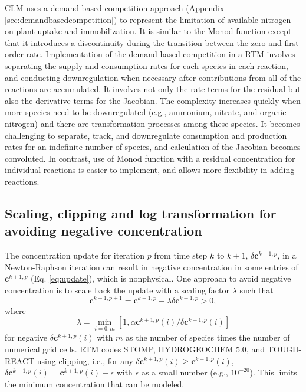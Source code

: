 \documentclass[gmd, manuscript]{copernicus}
\begin{document}
CLM uses a demand based competition approach (Appendix
\ref{sec:demandbasedcompetition}) to represent the limitation of available
nitrogen on plant uptake and immobilization. It is similar to the Monod
function except that it introduces a discontinuity during the transition
between the zero and first order rate. Implementation of the demand based
competition in a RTM involves separating the supply and consumption rates for
each species in each reaction, and conducting downregulation when necessary
after contributions from all of the reactions are accumulated. It involves not
only the rate terms for the residual but also the derivative terms for the
Jacobian. The complexity increases quickly when more species need to be
downregulated (e.g., ammonium, nitrate, and organic nitrogen) and there are
transformation processes among these species. It becomes challenging to
separate, track, and downregulate consumption and production rates for an
indefinite number of species, and calculation of the Jacobian becomes
convoluted. In contrast, use of Monod function with a residual concentration
for individual reactions is easier to implement, and allows more flexibility in
adding reactions.

\subsection{Scaling, clipping and log transformation for avoiding negative concentration}
The concentration update for iteration $p$ from time step $k$ to $k+1$, $\delta
\mathbf{c}^{k+1,p}$, in a Newton-Raphson iteration can result in negative
concentration in some entries of $\mathbf{c}^{k+1,p}$ (Eq. \ref{eq:update}),
which is nonphysical. One approach to avoid negative concentration is to scale
back the update with a scaling factor $\lambda$ \citep{Bethke2007,Hammond2003}
such that 
\begin{equation}
\mathbf{c}^{k+1,p+1}=\mathbf{c}^{k+1,p}+\lambda \delta \mathbf{c}^{k+1,p} > 0,
\label{eq:lambda}
\end{equation}
where
\begin{equation}
\lambda = \min_{i=0,m}\left[1, \alpha {\mathbf{c}^{k+1,p}(i)}/{\delta \mathbf{c}^{k+1,p} (i)}\right]
\label{eq:alpha}
\end{equation}
for negative $\delta \mathbf{c}^{k+1,p} (i)$ with $m$ as the number of species
times the number of numerical grid cells. RTM codes STOMP, HYDROGEOCHEM 5.0,
and TOUGH-REACT using clipping, i.e., for any $\delta \mathbf{c}^{k+1,p}(i)
\geq \mathbf{c}^{k+1,p}(i)$, $\delta \mathbf{c}^{k+1,p}(i) =
\mathbf{c}^{k+1,p}(i) - \epsilon$  with $\epsilon$ as a small number (e.g.,
$10^{-20}$). This limits the minimum concentration that can be modeled. 
\end{document}
